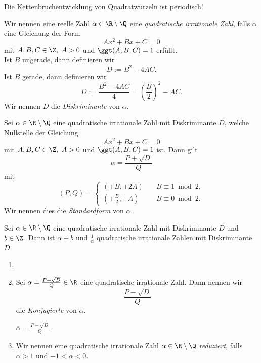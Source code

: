 \begin{obs*}
	Die Kettenbruchentwicklung von Quadratwurzeln ist periodisch!
\end{obs*}

\begin{defn*}
	Wir nennen eine reelle Zahl $\alpha \in \R \setminus \Q$ eine \emph{quadratische irrationale Zahl}, falls $\alpha$ eine Gleichung der Form
	\[ Ax^2+Bx+C = 0 \]
	mit $A,B,C \in \Z,\ A > 0$ und $\ggt(A,B,C)=1$ erfüllt.\\
	Ist $B$ ungerade, dann definieren wir
	\[ D := B^2-4AC. \]
	Ist $B$ gerade, dann definieren wir
	\[ D := \frac{B^2-4AC}{4} = \left( \frac{B}{2} \right)^2 - AC. \]
	Wir nennen $D$ die \emph{Diskriminante} von $\alpha$.
\end{defn*}

\begin{defn*}
	Sei $\alpha \in \R \setminus \Q$ eine quadratische irrationale Zahl mit Diskriminante $D$, welche Nullstelle der Gleichung
	\[Ax^2+Bx+C = 0\]
	mit $A,B,C \in \Z,\ A >0$ und $\ggt(A,B,C)=1$ ist. Dann gilt
	\[ \alpha = \frac{P + \sqrt{D}}{Q} \]
	mit
	\[ (P,Q) = \begin{cases}
		(\mp B, \pm 2A) \quad &B\equiv 1 \bmod 2,\\
		(\mp \frac{B}{2}, \pm A) \quad &B \equiv 0 \bmod 2.
	\end{cases} \]
	Wir nennen dies die \emph{Standardform} von $\alpha$.
\end{defn*}

\begin{lem}\autolabel
	Sei $\alpha \in \R \setminus \Q$ eine quadratische irrationale Zahl mit Diskriminante $D$ und $b \in \Z$. Dann ist $\alpha + b$ und $\frac{1}{\alpha}$ quadratische irrationale Zahlen mit Diskriminante $D$.
\end{lem}

\begin{defn*}
	\begin{enumerate}[label={\roman*})]
		\item[]
		\item Sei $\alpha = \frac{P + \sqrt{D}}{Q} \in \R$ eine quadratische irrationale Zahl. Dann nennen wir
			\[ \frac{P - \sqrt{D}}{Q} \]
			die \emph{Konjugierte} von $\alpha$.
			\begin{notat*}
				$\overbar{\alpha} = \frac{P- \sqrt{D}}{Q}$
			\end{notat*}
		\item Wir nennen eine quadratische irrationale Zahl $\alpha \in \R \setminus \Q$ \emph{reduziert}, falls $\alpha > 1$ und $-1 < \overbar{\alpha} < 0$.
	\end{enumerate}
\end{defn*}

